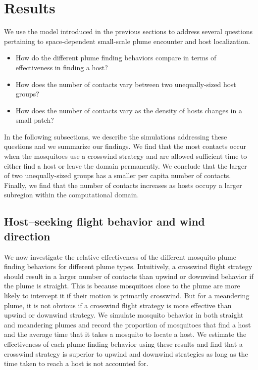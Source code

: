 \documentclass[10pt]{article}
\begin{document}
\section*{Results}
 We use the model introduced in the previous sections to address several questions pertaining to space-dependent  small-scale plume encounter and host localization.
	\begin{itemize}
		\item How do the different plume finding behaviors compare in terms of effectiveness in finding a host?
		\item How does the number of contacts vary between two unequally-sized host groups?
		\item How does the number of contacts vary as the density of hosts changes in a small patch?
	\end{itemize}
In the following subsections, we describe the simulations addressing these questions and we summarize our findings. We find that the most contacts occur when the mosquitoes use a crosswind strategy and are allowed sufficient time to either find a host or leave the domain permanently. We conclude that the larger of two unequally-sized groups has a smaller per capita number of contacts. Finally, we find that the number of contacts increases as hosts occupy a larger subregion within the computational domain.
	
		\subsection*{Host--seeking flight behavior and wind direction}\label{sec:res:meander}
			We now investigate the  relative effectiveness of the different mosquito plume finding behaviors for different plume types. Intuitively, a crosswind flight strategy should result in a larger number of contacts than upwind or downwind behavior if the plume is straight. This is because mosquitoes close to the plume are more likely to intercept it if their motion is primarily crosswind. But for a meandering plume, it is not obvious if a crosswind flight strategy is more effective than upwind or downwind strategy. We simulate mosquito behavior in both straight and meandering plumes and record the proportion of mosquitoes that find a host and the average time that it takes a mosquito to locate a host. We estimate the effectiveness of each plume finding behavior using these results and find that a crosswind strategy is superior to upwind and downwind strategies as long as the time taken to reach a host is not accounted for.
			
\end{document}
